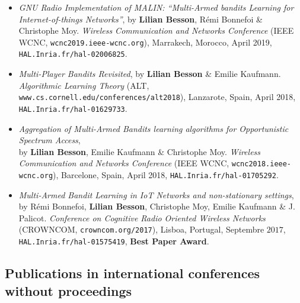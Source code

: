 \begin{itemize}
\item
    \emph{GNU Radio Implementation of MALIN: ``Multi-Armed bandits Learning for Internet-of-things Networks''},
    by \textbf{Lilian Besson}, Rémi Bonnefoi \& Christophe Moy.
    \emph{Wireless Communication and Networks Conference} (IEEE WCNC, \texttt{wcnc2019.ieee-wcnc.org}), Marrakech, Morocco, April 2019,
    \texttt{HAL.Inria.fr/hal-02006825}.
    \cite{Besson2019WCNC}

\item
    \emph{Multi-Player Bandits Revisited},
    by \textbf{Lilian Besson} \& Emilie Kaufmann.
    \emph{Algorithmic Learning Theory} (ALT, \texttt{www.cs.cornell.edu/conferences/alt2018}), Lanzarote, Spain, April 2018,
    \texttt{HAL.Inria.fr/hal-01629733}.
    \cite{Besson2018ALT}

\item
    \emph{Aggregation of Multi-Armed Bandits learning algorithms for Opportunistic Spectrum Access},\\
    by \textbf{Lilian Besson}, Emilie Kaufmann \& Christophe Moy.
    \emph{Wireless Communication and Networks Conference} (IEEE WCNC, \texttt{wcnc2018.ieee-wcnc.org}), Barcelone, Spain, April 2018,
    \texttt{HAL.Inria.fr/hal-01705292}.
    \cite{Besson2018WCNC}

\item
    \emph{Multi-Armed Bandit Learning in IoT Networks and non-stationary settings},
    by Rémi Bonnefoi, \textbf{Lilian Besson}, Christophe Moy, Emilie Kaufmann \& J. Palicot.
    \emph{Conference on Cognitive Radio Oriented Wireless Networks} (CROWNCOM, \texttt{crowncom.org/2017}), Lisboa, Portugal, Septembre $2017$,
    \texttt{HAL.Inria.fr/hal-01575419},
    \textbf{Best Paper Award}.
    \cite{Bonnefoi17}

\end{itemize}

\subsection{Publications in international conferences without proceedings}

